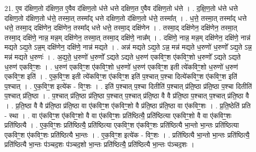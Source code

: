 \documentclass[17pt]{extarticle}
\begin{document}
21. ए॒व द॑क्षिण॒तो द॑क्षिण॒त ए॒वैव द॑क्षिण॒तो ध॑त्ते धत्ते दक्षिण॒त ए॒वैव द॑क्षिण॒तो ध॑त्ते । . द॒क्षि॒ण॒तो ध॑त्ते धत्ते दक्षिण॒तो द॑क्षिण॒तो ध॑त्ते॒ तस्मा॒त् तस्मा᳚द् धत्ते दक्षिण॒तो द॑क्षिण॒तो ध॑त्ते॒ तस्मा᳚त् । . ध॒त्ते॒ तस्मा॒त् तस्मा᳚द् धत्ते धत्ते॒ तस्मा॒द् दक्षि॑णेन॒ दक्षि॑णेन॒ तस्मा᳚द् धत्ते धत्ते॒ तस्मा॒द् दक्षि॑णेन । . तस्मा॒द् दक्षि॑णेन॒ दक्षि॑णेन॒ तस्मा॒त् तस्मा॒द् दक्षि॑णे॒ नान्न॒ मन्न॒म् दक्षि॑णेन॒ तस्मा॒त् तस्मा॒द् दक्षि॑णे॒ नान्न᳚म् । . दक्षि॑णे॒ नान्न॒ मन्न॒म् दक्षि॑णेन॒ दक्षि॑णे॒ नान्न॑ मद्यते ऽद्य॒ते ऽन्न॒म् दक्षि॑णेन॒ दक्षि॑णे॒ नान्न॑ मद्यते । . अन्न॑ मद्यते ऽद्य॒ते ऽन्न॒ मन्न॑ मद्यते ध॒रुणो॑ ध॒रुणो᳚ ऽद्य॒ते ऽन्न॒ मन्न॑ मद्यते ध॒रुणः॑ । . अ॒द्य॒ते॒ ध॒रुणो॑ ध॒रुणो᳚ ऽद्यते ऽद्यते ध॒रुण॑ एकविꣳ॒॒श ए॑कविꣳ॒॒शो ध॒रुणो᳚ ऽद्यते ऽद्यते ध॒रुण॑ एकविꣳ॒॒शः । . ध॒रुण॑ एकविꣳ॒॒श ए॑कविꣳ॒॒शो ध॒रुणो॑ ध॒रुण॑ एकविꣳ॒॒श इती त्ये॑कविꣳ॒॒शो ध॒रुणो॑ ध॒रुण॑ एकविꣳ॒॒श इति॑ । . ए॒क॒विꣳ॒॒श इती त्ये॑कविꣳ॒॒श ए॑कविꣳ॒॒श इति॑ प॒श्चात् प॒श्चा दित्ये॑कविꣳ॒॒श ए॑कविꣳ॒॒श इति॑ प॒श्चात् । . ए॒क॒विꣳ॒॒श इत्ये॑क - विꣳ॒॒शः । . इति॑ प॒श्चात् प॒श्चा दितीति॑ प॒श्चात् प्र॑ति॒ष्ठा प्र॑ति॒ष्ठा प॒श्चा दितीति॑ प॒श्चात् प्र॑ति॒ष्ठा । . प॒श्चात् प्र॑ति॒ष्ठा प्र॑ति॒ष्ठा प॒श्चात् प॒श्चात् प्र॑ति॒ष्ठा वै वै प्र॑ति॒ष्ठा प॒श्चात् प॒श्चात् प्र॑ति॒ष्ठा वै । . प्र॒ति॒ष्ठा वै वै प्र॑ति॒ष्ठा प्र॑ति॒ष्ठा वा ए॑कविꣳ॒॒श ए॑कविꣳ॒॒शो वै प्र॑ति॒ष्ठा प्र॑ति॒ष्ठा वा ए॑कविꣳ॒॒शः । . प्र॒ति॒ष्ठेति॑ प्रति - स्था । . वा ए॑कविꣳ॒॒श ए॑कविꣳ॒॒शो वै वा ए॑कविꣳ॒॒शः प्रति॑ष्ठित्यै॒ प्रति॑ष्ठित्या एकविꣳ॒॒शो वै वा ए॑कविꣳ॒॒शः प्रति॑ष्ठित्यै । . ए॒क॒विꣳ॒॒शः प्रति॑ष्ठित्यै॒ प्रति॑ष्ठित्या एकविꣳ॒॒श ए॑कविꣳ॒॒शः प्रति॑ष्ठित्यै भा॒न्तो भा॒न्तः प्रति॑ष्ठित्या एकविꣳ॒॒श ए॑कविꣳ॒॒शः प्रति॑ष्ठित्यै भा॒न्तः । . ए॒क॒विꣳ॒॒श इत्ये॑क - विꣳ॒॒शः । . प्रति॑ष्ठित्यै भा॒न्तो भा॒न्तः प्रति॑ष्ठित्यै॒ प्रति॑ष्ठित्यै भा॒न्तः प॑ञ्चद॒शः प॑ञ्चद॒शो भा॒न्तः प्रति॑ष्ठित्यै॒ प्रति॑ष्ठित्यै भा॒न्तः प॑ञ्चद॒शः । \newline
\end{document}
